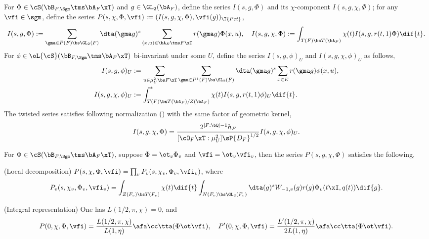 \documentclass[article, a4paper, twoside]{universal}
\begin{document}

\begin{stp}
    For $\Phi\in\cS(\bB_{F,\Sgm}\tms\bA_{F}\xT)$ and $g\in\GL_{2}(\bA_{F})$, define the series $I(s,g,\Phi)$ and its $\chi$-component $I(s,g,\chi,\Phi)$; for any $\vfi\in\sgm$, define the series $P(s,\chi,\Phi,\vfi):=(I(s,g,\chi,\Phi),\vfi(g))_{\T{Pet}}$,
    \[
        I(s,g,\Phi):=\sum_{\gma\in P(F)\bs\GL_{2}(F)}\dta(\gma g)^{s}\sum_{(x,u)\in \bA_{E}\tms F\xT}r(\gma g)\Phi(x,u),\quad I(s,g,\chi,\Phi):=\int_{T(F)\bs T(\bA_{F})}\chi(t)I(s,g,r(t,1)\Phi)\dif{t}.
    \]
    For $\phi\in\oL{\cS}(\bB_{F,\Sgm}\tms\bA_{F}\xT)$ bi-invariant under some $U$, define the series $I(s,g,\phi)_{U}$ and $I(s,g,\chi,\phi)_{U}$ as follows,
    \begin{align*}
      I(s,g,\phi)_{U}&:=\sum_{u\in\mu_{U}^{2}\bs F\xT}\sum_{\gma\in P^{1}(F)\bs\SL_{2}(F)}\dta(\gma g)^{s}\sum_{x\in E}r(\gma g)\phi(x,u),\\
      I(s,g,\chi,\phi)_{U}&:=\int_{T(F)\bs T(\bA_{F})/Z(\bA_{F})}^{*}\chi(t)I(s,g,r(t,1)\phi)_{U}\dif{t}.
    \end{align*}
    The twisted series satisfies following normalization (\cite[(5.1.3)]{YZZ2013}) with the same factor of geometric kernel,
    \[
        I(s,g,\chi,\Phi)=\frac{2^{[F:\bQ]-1}h_{F}}{[\cO_{F}\xT:\mu_{U}^{2}]\sP{D_{F}}^{1/2}}I(s,g,\chi,\phi)_{U}.
    \]
\end{stp}


\begin{thm}\label{thm:integral-representation}
    For $\Phi\in\cS(\bB_{F,\Sgm}\tms\bA_{F}\xT)$, suppose $\Phi=\ot_{v}\Phi_{v}$ and $\vfi=\ot_{v}\vfi_{v}$, then the series $P(s,g,\chi,\Phi)$ satisfies the following,
    \begin{itm}
        \item (Local decomposition) $P(s,\chi,\Phi,\vfi)=\prod_{v}P_{v}(s,\chi_{v},\Phi_{v},\vfi_{v})$, where
        \[
            P_{v}(s,\chi_{v},\Phi_{v},\vfi_{v})=\int_{Z(F_{v})\bs T(F_{v})}\chi(t)\dif{t}\int_{N(F_{v})\bs\GL_{2}(F_{v})}\dta(g)^{s}W_{-1,v}(g)r(g)\Phi_{v}(t\xI,q(t))\dif{g}.
        \]
        \item (Integral representation) One has $L(1/2, \pi, \chi)=0$, and
        \[
            P(0,\chi,\Phi,\vfi)=\frac{L(1/2,\pi,\chi)}{L(1,\eta)}\afa\cc\tta(\Phi\ot\vfi),\quad P'(0,\chi,\Phi,\vfi)=\frac{L'(1/2,\pi,\chi)}{2L(1,\eta)}\afa\cc\tta(\Phi\ot\vfi).
        \]
    \end{itm}
\end{thm}
\end{document}
